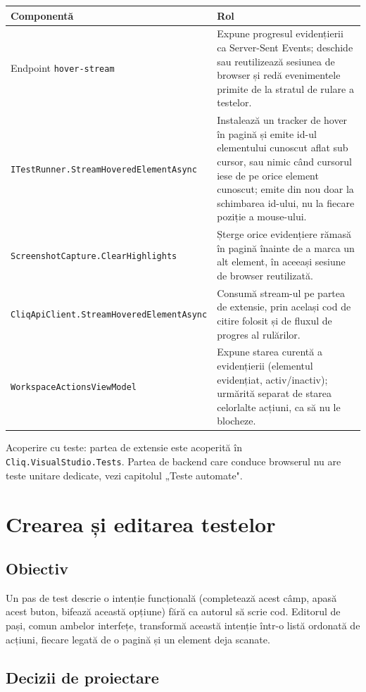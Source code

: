 \documentclass[12pt,a4paper]{report}
\newcommand{\File}[1]{\nolinkurl{#1}}
\begin{document}
\begin{tabularx}{\textwidth}{@{}p{5.3cm}Y@{}}
\toprule \textbf{Componentă} & \textbf{Rol} \\
\midrule
Endpoint \File{hover-stream} & Expune progresul evidențierii ca Server-Sent Events; deschide sau reutilizează sesiunea de browser și redă evenimentele primite de la stratul de rulare a testelor. \\
\File{ITestRunner.StreamHoveredElementAsync} & Instalează un tracker de hover în pagină și emite id-ul elementului cunoscut aflat sub cursor, sau nimic când cursorul iese de pe orice element cunoscut; emite din nou doar la schimbarea id-ului, nu la fiecare poziție a mouse-ului. \\
\File{ScreenshotCapture.ClearHighlights} & Șterge orice evidențiere rămasă în pagină înainte de a marca un alt element, în aceeași sesiune de browser reutilizată. \\
\File{CliqApiClient.StreamHoveredElementAsync} & Consumă stream-ul pe partea de extensie, prin același cod de citire folosit și de fluxul de progres al rulărilor. \\
\File{WorkspaceActionsViewModel} & Expune starea curentă a evidențierii (elementul evidențiat, activ/inactiv); urmărită separat de starea celorlalte acțiuni, ca să nu le blocheze. \\
\bottomrule
\end{tabularx}

Acoperire cu teste: partea de extensie este acoperită în \File{Cliq.VisualStudio.Tests}. Partea de backend care conduce browserul nu are teste unitare dedicate, vezi capitolul „Teste automate".

\chapter{Crearea și editarea testelor}

\section{Obiectiv}

Un pas de test descrie o intenție funcțională (completează acest câmp, apasă acest buton, bifează această opțiune) fără ca autorul să scrie cod. Editorul de pași, comun ambelor interfețe, transformă această intenție într-o listă ordonată de acțiuni, fiecare legată de o pagină și un element deja scanate.

\section{Decizii de proiectare}
\end{document}
